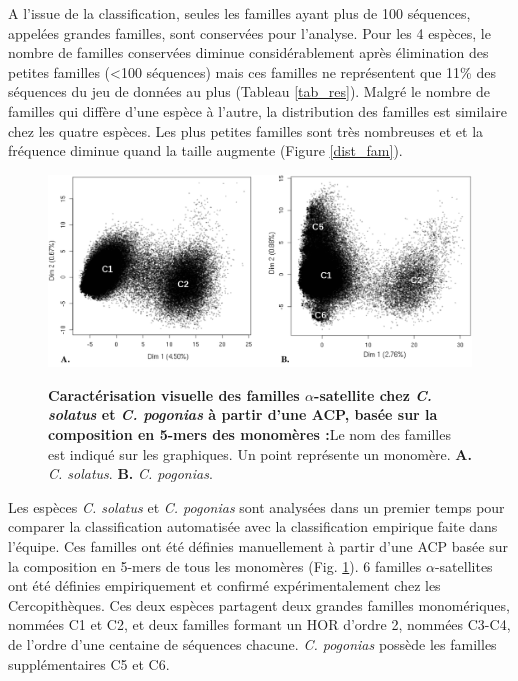 \documentclass[12pt,a4paper]{article}
\begin{document}
	A l'issue de la classification, seules les familles ayant plus de 100 séquences, appelées grandes familles, sont conservées pour l'analyse. Pour les 4 espèces, le nombre de familles conservées diminue considérablement après élimination des petites familles (<100 séquences) mais ces familles ne représentent que 11\% des séquences du jeu de données au plus (Tableau \ref{tab_res}). Malgré le nombre de familles qui diffère d'une espèce à l'autre, la distribution des familles est similaire chez les quatre espèces. Les plus petites familles sont très nombreuses et et la fréquence diminue quand la taille augmente (Figure \ref{dist_fam}). 

		\begin{figure}	
			\includegraphics[scale=0.4]{img/ACP_experimental.png}  \\
			\caption{\textbf{Caractérisation visuelle des familles $\alpha$-satellite chez \textit{C. solatus} et \textit{C. pogonias} à partir d'une ACP, basée sur la composition en 5-mers des monomères :}Le nom des familles est indiqué sur les graphiques. Un point représente un monomère. \textbf{A.} \textit{C. solatus}. \textbf{B.} \textit{C. pogonias}.}
			\label{fig:ACP_exp} 
	\end{figure}	
	
	Les espèces \textit{C. solatus} et \textit{C. pogonias} sont analysées dans un premier temps pour comparer la classification automatisée avec la classification empirique faite dans l'équipe. Ces familles ont été définies manuellement à partir d'une ACP basée sur la composition en 5-mers de tous les monomères (Fig. \ref{fig:ACP_exp}). 6 familles $\alpha$-satellites ont été définies empiriquement et confirmé expérimentalement chez les Cercopithèques. Ces deux espèces partagent deux grandes familles monomériques, nommées C1 et C2, et deux familles formant un HOR d'ordre 2, nommées C3-C4, de l'ordre d'une centaine de séquences chacune. \textit{C. pogonias} possède les familles supplémentaires C5 et C6.
	
\end{document}
